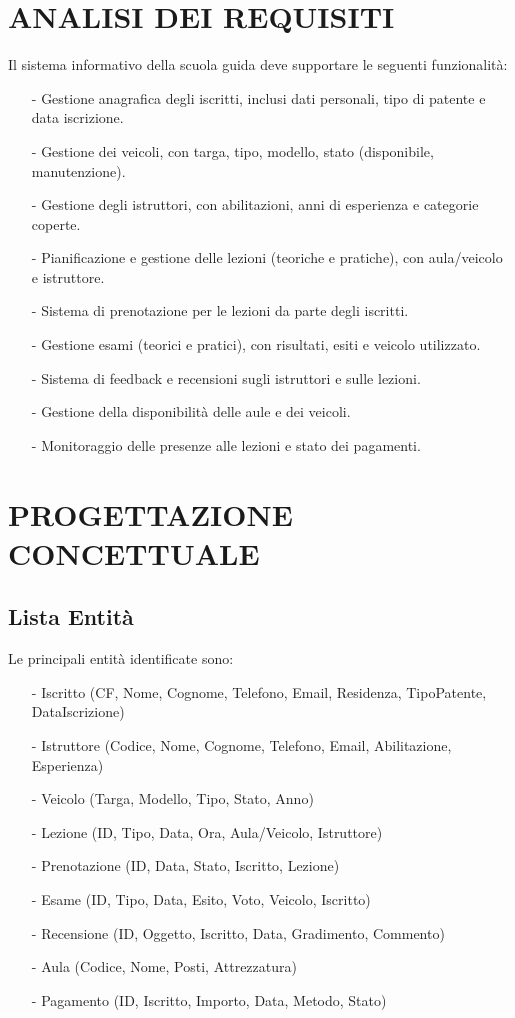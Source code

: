 \documentclass[10pt]{article}
\begin{document}
\section{ANALISI DEI REQUISITI}{
    Il sistema informativo della scuola guida deve supportare le seguenti funzionalità:

    \begin{itemize}
        \item[-] Gestione anagrafica degli iscritti, inclusi dati personali, tipo di patente e data iscrizione.
        \item[-] Gestione dei veicoli, con targa, tipo, modello, stato (disponibile, manutenzione).
        \item[-] Gestione degli istruttori, con abilitazioni, anni di esperienza e categorie coperte.
        \item[-] Pianificazione e gestione delle lezioni (teoriche e pratiche), con aula/veicolo e istruttore.
        \item[-] Sistema di prenotazione per le lezioni da parte degli iscritti.
        \item[-] Gestione esami (teorici e pratici), con risultati, esiti e veicolo utilizzato.
        \item[-] Sistema di feedback e recensioni sugli istruttori e sulle lezioni.
        \item[-] Gestione della disponibilità delle aule e dei veicoli.
        \item[-] Monitoraggio delle presenze alle lezioni e stato dei pagamenti.
    \end{itemize}
}

\newpage

\section{PROGETTAZIONE CONCETTUALE}{
    \subsection{Lista Entità}{
        Le principali entità identificate sono:
        \begin{itemize}
            \item[-] Iscritto (CF, Nome, Cognome, Telefono, Email, Residenza, TipoPatente, DataIscrizione)
            \item[-] Istruttore (Codice, Nome, Cognome, Telefono, Email, Abilitazione, Esperienza)
            \item[-] Veicolo (Targa, Modello, Tipo, Stato, Anno)
            \item[-] Lezione (ID, Tipo, Data, Ora, Aula/Veicolo, Istruttore)
            \item[-] Prenotazione (ID, Data, Stato, Iscritto, Lezione)
            \item[-] Esame (ID, Tipo, Data, Esito, Voto, Veicolo, Iscritto)
            \item[-] Recensione (ID, Oggetto, Iscritto, Data, Gradimento, Commento)
            \item[-] Aula (Codice, Nome, Posti, Attrezzatura)
            \item[-] Pagamento (ID, Iscritto, Importo, Data, Metodo, Stato)
        \end{itemize}
    }
}
\end{document}
